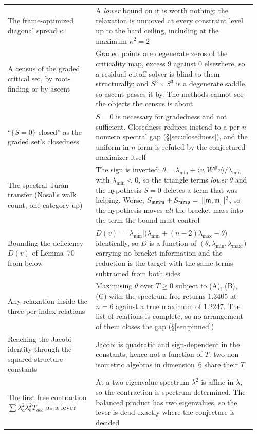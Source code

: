 \begin{longtable}{@{}p{0.34\linewidth}p{0.62\linewidth}@{}}
The frame-optimized diagonal spread $\kappa$ & A \emph{lower} bound on it is worth nothing: the relaxation is unmoved at every constraint level up to the hard ceiling, including at the maximum $\kappa^2=2$ \\
A census of the graded critical set, by root-finding or by ascent & Graded points are degenerate zeros of the criticality map, excess $9$ against $0$ elsewhere, so a residual-cutoff solver is blind to them structurally; and $S^3\times S^3$ is a degenerate saddle, so ascent passes it by. The methods cannot see the objects the census is about \\
``$\{S=0\}$ closed'' as the graded set's closedness & $S=0$ is necessary for gradedness and not sufficient. Closedness reduces instead to a per-$n$ nonzero spectral gap (\S\ref{sec:closedness}), and the uniform-in-$n$ form is refuted by the conjectured maximizer itself \\
The spectral Tur\'an transfer (Nosal's walk count, one category up) & The sign is inverted: $\theta=\lambda_{\min}+\langle v,W^{\#}v\rangle/\lambda_{\min}$ with $\lambda_{\min}<0$, so the triangle terms \emph{lower} $\theta$ and the hypothesis $S=0$ deletes a term that was helping. Worse, $S_{\mathfrak{mmm}}+S_{\mathfrak{mmp}}=\|[\mathfrak{m},\mathfrak{m}]\|^2$, so the hypothesis moves \emph{all} the bracket mass into the term the bound must control \\
Bounding the deficiency $D(v)$ of Lemma~70 from below & $D(v)=\lvert\lambda_{\min}\rvert\big(\lambda_{\min}+(n-2)\lambda_{\max}-\theta\big)$ identically, so $D$ is a function of $(\theta,\lambda_{\min},\lambda_{\max})$ carrying no bracket information and the reduction is the target with the same terms subtracted from both sides \\
Any relaxation inside the three per-index relations & Maximising $\theta$ over $T\ge0$ subject to (A), (B), (C) with the spectrum free returns $1.3405$ at $n=6$ against a true maximum of $1.2247$. The list of relations is complete, so no arrangement of them closes the gap (\S\ref{sec:pinned}) \\
Reaching the Jacobi identity through the squared structure constants & Jacobi is quadratic and sign-dependent in the constants, hence not a function of $T$: two non-isometric algebras in dimension~$6$ share their $T$ \\
The first free contraction $\sum\lambda_a^2\lambda_b^2T_{abc}$ as a lever & At a two-eigenvalue spectrum $\lambda^2$ is affine in $\lambda$, so the contraction is spectrum-determined. The balanced product has two eigenvalues, so the lever is dead exactly where the conjecture is decided \\
\bottomrule
\end{longtable}


